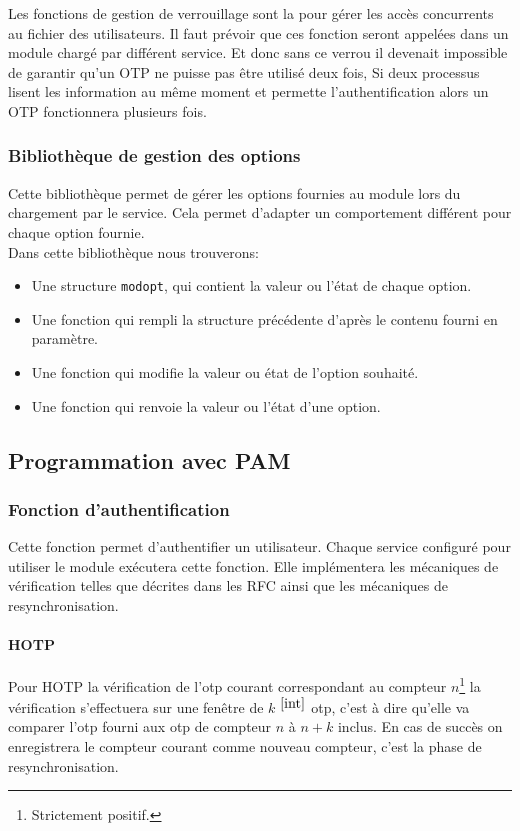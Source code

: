 Les fonctions de gestion de verrouillage sont la pour gérer les accès concurrents
au fichier des utilisateurs. Il faut prévoir que ces fonction seront appelées
dans un module chargé par différent service. Et donc sans ce verrou il devenait
impossible de garantir qu'un OTP ne puisse pas être utilisé deux fois, Si deux
processus lisent les information au même moment et permette l'authentification
alors un OTP fonctionnera plusieurs fois.

\subsubsection{Bibliothèque de gestion des options}
Cette bibliothèque permet de gérer les options fournies au module lors du chargement
par le service. Cela permet d'adapter un comportement différent pour chaque option fournie.\\
Dans cette bibliothèque nous trouverons:
\begin{itemize}
  \item Une structure \verb?modopt?, qui contient la valeur ou l'état de chaque option.
  \item Une fonction qui rempli la structure précédente d'après le contenu fourni en paramètre.
  \item Une fonction qui modifie la valeur ou état de l'option souhaité.
  \item Une fonction qui renvoie la valeur ou l'état d'une option.
\end{itemize}

\subsection{Programmation avec PAM}
\subsubsection{Fonction d'authentification}
Cette fonction permet d'authentifier un utilisateur. Chaque service configuré
pour utiliser le module exécutera cette fonction. Elle implémentera les
mécaniques de vérification telles que décrites dans les RFC ainsi que les
mécaniques de resynchronisation.
\paragraph{HOTP}
Pour HOTP la vérification de l'otp courant correspondant au compteur
$n$\footnote{Strictement positif.\label{int}} la vérification s'effectuera sur
une fenêtre de  $k$ $^{\ref{int}}$ otp, c'est à dire qu'elle va comparer l'otp
fourni aux otp de compteur $n$ à $n+k$ inclus. En cas de succès on enregistrera
le compteur courant comme nouveau compteur, c'est la phase de resynchronisation.
